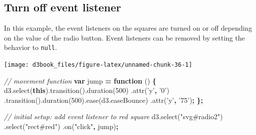 \documentclass[openany]{book}
\newenvironment{Shaded}{\begin{snugshade}}{\end{snugshade}}
\newcommand{\AttributeTok}[1]{\textcolor[rgb]{0.77,0.63,0.00}{#1}}
\newcommand{\CommentTok}[1]{\textcolor[rgb]{0.56,0.35,0.01}{\textit{#1}}}
\newcommand{\DecValTok}[1]{\textcolor[rgb]{0.00,0.00,0.81}{#1}}
\newcommand{\KeywordTok}[1]{\textcolor[rgb]{0.13,0.29,0.53}{\textbf{#1}}}
\newcommand{\NormalTok}[1]{#1}
\newcommand{\OperatorTok}[1]{\textcolor[rgb]{0.81,0.36,0.00}{\textbf{#1}}}
\newcommand{\StringTok}[1]{\textcolor[rgb]{0.31,0.60,0.02}{#1}}
\newcommand{\VariableTok}[1]{\textcolor[rgb]{0.00,0.00,0.00}{#1}}
\begin{document}
\hypertarget{turn-off-event-listener}{%
\subsection{Turn off event listener}\label{turn-off-event-listener}}

In this example, the event listeners on the squares are turned on or off depending on the value of the radio button. Event listeners can be removed by setting the behavior to \texttt{null}.

\begin{center}\texttt{[image: d3book\_files/figure-latex/unnamed-chunk-36-1]} \end{center}

\begin{Shaded}
\begin{Highlighting}[]
\CommentTok{// movement function}
\KeywordTok{var}\NormalTok{ jump }\OperatorTok{=} \KeywordTok{function}\NormalTok{ () }\OperatorTok{\{}
      \VariableTok{d3}\NormalTok{.}\AttributeTok{select}\NormalTok{(}\KeywordTok{this}\NormalTok{).}\AttributeTok{transition}\NormalTok{().}\AttributeTok{duration}\NormalTok{(}\DecValTok{500}\NormalTok{)}
\NormalTok{      .}\AttributeTok{attr}\NormalTok{(}\StringTok{'y'}\OperatorTok{,} \StringTok{'0'}\NormalTok{)}
\NormalTok{      .}\AttributeTok{transition}\NormalTok{().}\AttributeTok{duration}\NormalTok{(}\DecValTok{500}\NormalTok{).}\AttributeTok{ease}\NormalTok{(}\VariableTok{d3}\NormalTok{.}\AttributeTok{easeBounce}\NormalTok{)}
\NormalTok{      .}\AttributeTok{attr}\NormalTok{(}\StringTok{'y'}\OperatorTok{,} \StringTok{'75'}\NormalTok{)}\OperatorTok{;}
\OperatorTok{\};}

\CommentTok{// initial setup: add event listener to red square}
\VariableTok{d3}\NormalTok{.}\AttributeTok{select}\NormalTok{(}\StringTok{"svg#radio2"}\NormalTok{)}
\NormalTok{  .}\AttributeTok{select}\NormalTok{(}\StringTok{"rect#red"}\NormalTok{)}
\NormalTok{  .}\AttributeTok{on}\NormalTok{(}\StringTok{"click"}\OperatorTok{,}\NormalTok{ jump)}\OperatorTok{;}
    

\end{Highlighting}
\end{Shaded}
\end{document}
